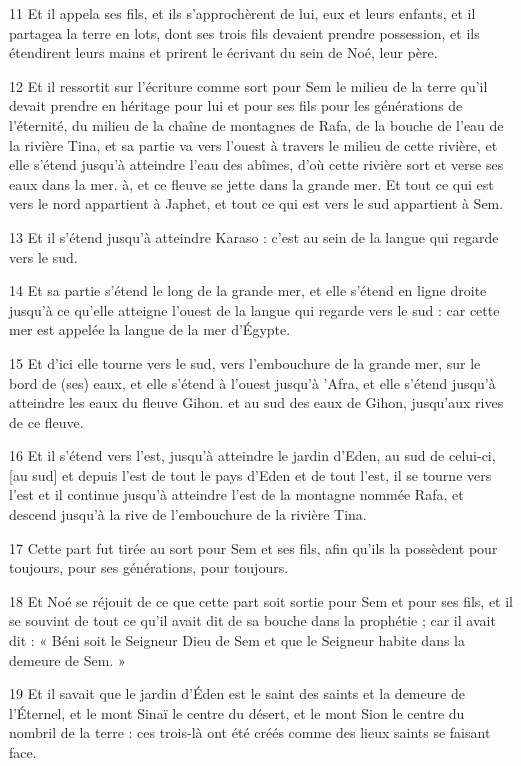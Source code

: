 \par 11 Et il appela ses fils, et ils s'approchèrent de lui, eux et leurs enfants, et il partagea la terre en lots, dont ses trois fils devaient prendre possession, et ils étendirent leurs mains et prirent le écrivant du sein de Noé, leur père.
\par 12 Et il ressortit sur l'écriture comme sort pour Sem le milieu de la terre qu'il devait prendre en héritage pour lui et pour ses fils pour les générations de l'éternité, du milieu de la chaîne de montagnes de Rafa, de la bouche de l'eau de la rivière Tina, et sa partie va vers l'ouest à travers le milieu de cette rivière, et elle s'étend jusqu'à atteindre l'eau des abîmes, d'où cette rivière sort et verse ses eaux dans la mer. à, et ce fleuve se jette dans la grande mer. Et tout ce qui est vers le nord appartient à Japhet, et tout ce qui est vers le sud appartient à Sem.
\par 13 Et il s'étend jusqu'à atteindre Karaso : c'est au sein de la langue qui regarde vers le sud.
\par 14 Et sa partie s'étend le long de la grande mer, et elle s'étend en ligne droite jusqu'à ce qu'elle atteigne l'ouest de la langue qui regarde vers le sud : car cette mer est appelée la langue de la mer d'Égypte.
\par 15 Et d'ici elle tourne vers le sud, vers l'embouchure de la grande mer, sur le bord de (ses) eaux, et elle s'étend à l'ouest jusqu'à 'Afra, et elle s'étend jusqu'à atteindre les eaux du fleuve Gihon. et au sud des eaux de Gihon, jusqu'aux rives de ce fleuve.
\par 16 Et il s'étend vers l'est, jusqu'à atteindre le jardin d'Eden, au sud de celui-ci, [au sud] et depuis l'est de tout le pays d'Eden et de tout l'est, il se tourne vers l'est et il continue jusqu'à atteindre l'est de la montagne nommée Rafa, et descend jusqu'à la rive de l'embouchure de la rivière Tina.
\par 17 Cette part fut tirée au sort pour Sem et ses fils, afin qu'ils la possèdent pour toujours, pour ses générations, pour toujours.
\par 18 Et Noé se réjouit de ce que cette part soit sortie pour Sem et pour ses fils, et il se souvint de tout ce qu'il avait dit de sa bouche dans la prophétie ; car il avait dit : « Béni soit le Seigneur Dieu de Sem et que le Seigneur habite dans la demeure de Sem. »
\par 19 Et il savait que le jardin d'Éden est le saint des saints et la demeure de l'Éternel, et le mont Sinaï le centre du désert, et le mont Sion le centre du nombril de la terre : ces trois-là ont été créés comme des lieux saints se faisant face.
